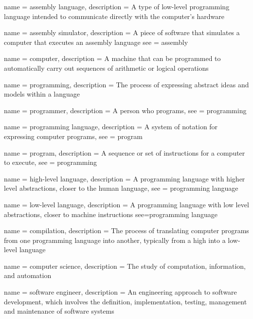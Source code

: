 \makeglossaries


 {
  name = {assembly language},
  description = {A type of low-level programming language intended to communicate directly with the computer's hardware}
}

 {
  name = {assembly simulator},
  description = {A piece of software that simulates a computer that executes an assembly language}
  see = {assembly}
}

 {
  name = {computer},
  description = {A machine that can be programmed to automatically carry out sequences of arithmetic or logical operations}
}

 {
  name = {programming},
  description = {The process of expressing abstract ideas and models within a language}
}

 {
  name = {programmer},
  description = {A person who programs},
  see = {programming}
}

 {
  name = {programming language},
  description = {A system of notation for expressing computer programs},
  see = {program}
}

 {
  name = {program},
  description = {A sequence or set of instructions for a computer to execute},
  see = {programming}
}

 {
  name = {high-level language},
  description = {A programming language with higher level abstractions, closer to the human language},
  see = {programming language}
}

 {
  name = {low-level language},
  description = {A programming language with low level abstractions, closer to machine instructions}
  see={programming language}
}

 {
  name = {compilation},
  description = {The process of translating computer programs from one programming language into another, typically from a high into a low-level language}
}

 {
  name = {computer science},
  description = {The study of computation, information, and automation}
}

 {
  name = {software engineer},
  description = {An engineering approach to software development, which involves the definition, implementation, testing, management and maintenance of software systems}
}

